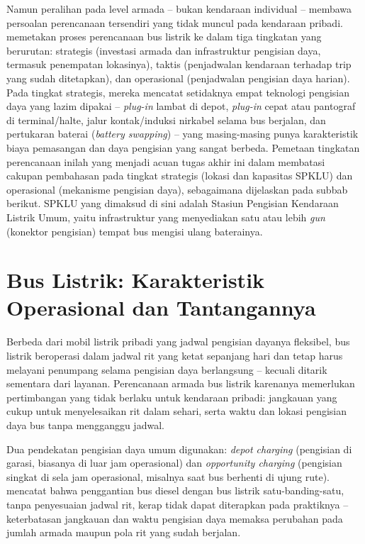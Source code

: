 Namun peralihan pada level armada -- bukan kendaraan individual -- membawa
persoalan perencanaan tersendiri yang tidak muncul pada kendaraan pribadi.
\textcite{perumal2022} memetakan proses
perencanaan bus listrik ke dalam tiga tingkatan yang berurutan: strategis
(investasi armada dan infrastruktur pengisian daya, termasuk penempatan
lokasinya), taktis (penjadwalan kendaraan terhadap trip yang sudah
ditetapkan), dan operasional (penjadwalan pengisian daya harian). Pada
tingkat strategis, mereka mencatat setidaknya empat teknologi pengisian daya
yang lazim dipakai -- \textit{plug-in} lambat di depot, \textit{plug-in}
cepat atau pantograf di terminal/halte, jalur kontak/induksi nirkabel
selama bus berjalan, dan pertukaran baterai (\textit{battery swapping}) --
yang masing-masing punya karakteristik biaya pemasangan dan daya pengisian
yang sangat berbeda. Pemetaan tingkatan perencanaan inilah yang menjadi
acuan tugas akhir ini dalam membatasi cakupan pembahasan pada tingkat
strategis (lokasi dan kapasitas SPKLU) dan operasional (mekanisme
pengisian daya), sebagaimana dijelaskan pada subbab berikut. SPKLU yang
dimaksud di sini adalah Stasiun Pengisian Kendaraan Listrik Umum, yaitu
infrastruktur yang menyediakan satu atau lebih \textit{gun} (konektor
pengisian) tempat bus mengisi ulang baterainya.

\section{Bus Listrik: Karakteristik Operasional dan Tantangannya}
\label{sec:bus-listrik}

Berbeda dari mobil listrik pribadi yang jadwal pengisian dayanya fleksibel,
bus listrik beroperasi dalam jadwal rit yang ketat sepanjang hari dan tetap
harus melayani penumpang selama pengisian daya berlangsung -- kecuali
ditarik sementara dari layanan. Perencanaan armada bus listrik karenanya
memerlukan pertimbangan yang tidak berlaku untuk kendaraan pribadi:
jangkauan yang cukup untuk menyelesaikan rit dalam sehari, serta waktu dan
lokasi pengisian daya bus tanpa mengganggu jadwal.

Dua pendekatan pengisian daya umum digunakan: \textit{depot charging}
(pengisian di garasi, biasanya di luar jam operasional) dan
\textit{opportunity charging} (pengisian singkat di sela jam operasional,
misalnya saat bus berhenti di ujung rute). \textcite{jefferiesgohlich2020} mencatat bahwa penggantian bus diesel dengan
bus listrik satu-banding-satu, tanpa penyesuaian jadwal rit, kerap tidak
dapat diterapkan pada praktiknya -- keterbatasan jangkauan dan waktu
pengisian daya memaksa perubahan pada jumlah armada maupun pola rit yang
sudah berjalan.

